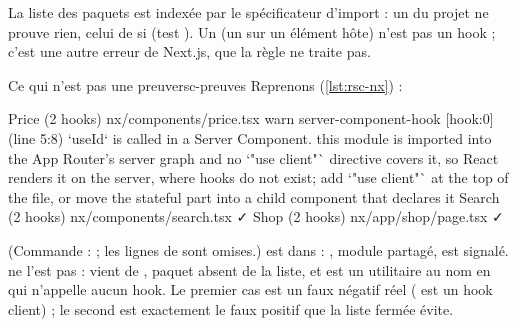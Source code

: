 La liste des paquets est indexée par le spécificateur d'import : un  du projet ne
prouve rien, celui de  si (test ).
Un  (un  sur un élément hôte) n'est pas un hook ; c'est une
autre erreur de Next.js, que la règle ne traite pas.

\begin{exemple}{Ce qui n'est pas une preuve}{rsc-preuves}
Reprenons  (\cref{lst:rsc-nx}) :
\begin{sortie}
  Price  (2 hooks)  nx/components/price.tsx
    warn   server-component-hook  [hook:0]  (line 5:8)  `useId` is called in a Server Component. this
      module is imported into the App Router's server graph and no `"use client"` directive covers
      it, so React renders it on the server, where hooks do not exist; add `"use client"` at the
      top of the file, or move the stateful part into a child component that declares it
  Search  (2 hooks)  nx/components/search.tsx  ✓
  Shop  (2 hooks)  nx/app/shop/page.tsx  ✓
\end{sortie}
(Commande :  ; les lignes
 de  sont omises.)  est dans
 : , module partagé, est signalé.  ne l'est pas :
 vient de , paquet absent de la liste, et
 est un utilitaire au nom en  qui n'appelle aucun hook. Le premier cas
est un faux négatif réel ( est un hook client) ; le second est exactement le
faux positif que la liste fermée évite.
\end{exemple}

